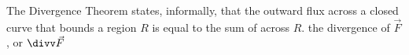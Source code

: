 {The Divergence Theorem states, informally, that the outward flux across a closed curve that bounds a region $R$ is equal to the sum of \underline{\hskip1in} across $R$.
}
{the divergence of $\vec F$, or $\divv \vec F$
}
